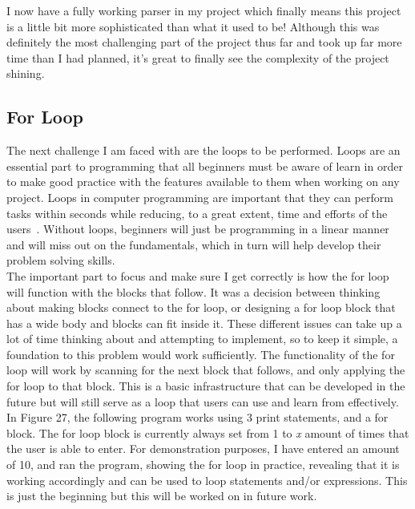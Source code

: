 \documentclass[a4paper, 12pt]{article}
\begin{document}
            I now have a fully working parser in my project which finally means this project
            is a little bit more sophisticated than what it used to be! Although this was definitely
            the most challenging part of the project thus far and took up far more time than I
            had planned, it's great to finally see the complexity of the project shining.


        \clearpage
        \subsection{For Loop}
            The next challenge I am faced with are the loops to be performed. Loops are an essential
            part to programming that all beginners must be aware of learn in order to make good
            practice with the features available to them when working on any project. Loops in
            computer programming are important that they can perform tasks within seconds while
            reducing, to a great extent, time and efforts of the users~\cite{loops}. Without loops,
            beginners will just be programming in a linear manner and will miss out on the fundamentals,
            which in turn will help develop their problem solving skills. \\

            The important part to focus and make sure I get correctly is how the for loop will
            function with the blocks that follow. It was a decision between thinking about making
            blocks connect to the for loop, or designing a for loop block that has a wide body and
            blocks can fit inside it. These different issues can take up a lot of time thinking
            about and attempting to implement, so to keep it simple, a foundation to this problem
            would work sufficiently. The functionality of the for loop will work by scanning for
            the next block that follows, and only applying the for loop to that block. This is
            a basic infrastructure that can be developed in the future but will still serve as
            a loop that users can use and learn from effectively. \\

            In Figure 27, the following program works using 3 print statements, and a for block.
            The for loop block is currently always set from 1 to \textit{x} amount of times that
            the user is able to enter. For demonstration purposes, I have entered an amount of 10,
            and ran the program, showing the for loop in practice, revealing that it is working
            accordingly and can be used to loop statements and/or expressions. This is just the
            beginning but this will be worked on in future work.
\end{document}

